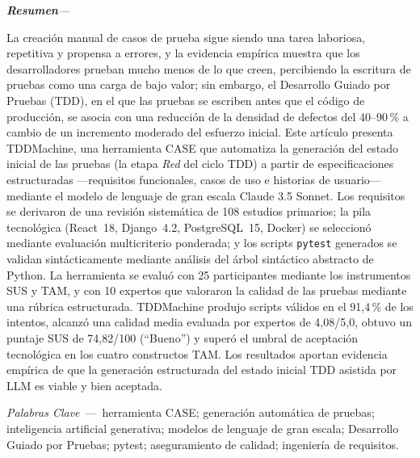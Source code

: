 \documentclass[10pt,journal,twoside,letterpaper]{IEEEtran}
\renewcommand{\figurename}{Fig.}%
\renewcommand{\tablename}{TABLE}%
\renewcommand{\refname}{References}%
\renewcommand{\bibname}{References}%
\newenvironment{resumen}{%
	\vspace{0.3em}
	\noindent\normalfont\small\itshape\textbf{Resumen}\hspace{0.5em}\textmd{---}\hspace{0.3em}%
	\ignorespaces
}{%
	\par\vspace{0.3em}%
}
\newcommand{\palabrasclave}[1]{%
	\vspace{0.2em}
	\noindent\small\textit{Palabras Clave}~---~#1
	\par\vspace{0.4em}
}
\begin{document}
	\begin{resumen}
		La creación manual de casos de prueba sigue siendo una tarea laboriosa, repetitiva y propensa a errores, y la evidencia empírica muestra que los desarrolladores prueban mucho menos de lo que creen, percibiendo la escritura de pruebas como una carga de bajo valor; sin embargo, el Desarrollo Guiado por Pruebas (TDD), en el que las pruebas se escriben antes que el código de producción, se asocia con una reducción de la densidad de defectos del 40--90\,\% a cambio de un incremento moderado del esfuerzo inicial. Este artículo presenta TDDMachine, una herramienta CASE que automatiza la generación del estado inicial de las pruebas (la etapa \emph{Red} del ciclo TDD) a partir de especificaciones estructuradas ---requisitos funcionales, casos de uso e historias de usuario--- mediante el modelo de lenguaje de gran escala Claude 3.5 Sonnet. Los requisitos se derivaron de una revisión sistemática de 108 estudios primarios; la pila tecnológica (React~18, Django~4.2, PostgreSQL~15, Docker) se seleccionó mediante evaluación multicriterio ponderada; y los scripts \texttt{pytest} generados se validan sintácticamente mediante análisis del árbol sintáctico abstracto de Python. La herramienta se evaluó con 25 participantes mediante los instrumentos SUS y TAM, y con 10 expertos que valoraron la calidad de las pruebas mediante una rúbrica estructurada. TDDMachine produjo scripts válidos en el 91,4\,\% de los intentos, alcanzó una calidad media evaluada por expertos de 4,08/5,0, obtuvo un puntaje SUS de 74,82/100 (``Bueno'') y superó el umbral de aceptación tecnológica en los cuatro constructos TAM. Los resultados aportan evidencia empírica de que la generación estructurada del estado inicial TDD asistida por LLM es viable y bien aceptada.
	\end{resumen}
	
	\palabrasclave{herramienta CASE; generación automática de pruebas; inteligencia artificial generativa; modelos de lenguaje de gran escala; Desarrollo Guiado por Pruebas; pytest; aseguramiento de calidad; ingeniería de requisitos.}
	
	\renewcommand{\figurename}{Fig.}
	\renewcommand{\tablename}{TABLE}
	\renewcommand{\refname}{References}
	\renewcommand{\bibname}{References}
	
\end{document}

